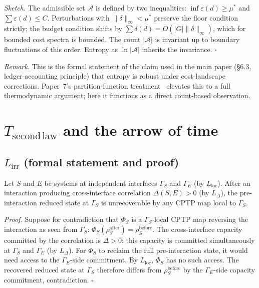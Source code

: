 \documentclass[11pt]{article}
\theoremstyle{remark}
\begin{document}
\textit{Sketch.}  The admissible set $\mathcal{A}$ is defined by two
inequalities: $\inf \varepsilon(d) \ge \mu^*$ and $\sum \varepsilon(d) \le C$.
Perturbations with $\|\delta\|_\infty < \mu^*$ preserve the floor
condition strictly; the budget condition shifts by $\sum \delta(d) = O(|G|\|\delta\|_\infty)$,
which for bounded cost spectra is bounded.  The count $|\mathcal{A}|$
is invariant up to boundary fluctuations of this order.  Entropy as
$\ln |\mathcal{A}|$ inherits the invariance.  \hfill$\square$

\noindent\textit{Remark.}  This is the formal statement of the claim
used in the main paper (\S 6.3, ledger-accounting principle) that entropy
is robust under cost-landscape corrections.  Paper~7's partition-function
treatment~\cite{Paper7} elevates this to a full thermodynamic argument;
here it functions as a direct count-based observation.


\section{$T_{\mathrm{second\,law}}$ and the arrow of time}
\label{sec:irr}

\subsection{$L_{\mathrm{irr}}$ (formal statement and proof)}

\begin{tcolorbox}[apfbox, title={Lemma 5.1 ($L_{\mathrm{irr}}$)}]
Let $S$ and $E$ be systems at independent interfaces $\Gamma_S$ and
$\Gamma_E$ (by $L_{\mathrm{loc}}$).  After an interaction producing
cross-interface correlation $\Delta(S,E) > 0$ (by $L_\Delta$), the
pre-interaction reduced state at $\Gamma_S$ is unrecoverable by any
CPTP map local to $\Gamma_S$.
\end{tcolorbox}

\textit{Proof.}  Suppose for contradiction that $\Phi_S$ is a
$\Gamma_S$-local CPTP map reversing the interaction as seen from
$\Gamma_S$: $\Phi_S(\rho_S^{\mathrm{after}}) = \rho_S^{\mathrm{before}}$.
The cross-interface capacity committed by the correlation is $\Delta > 0$;
this capacity is committed simultaneously at $\Gamma_S$ and $\Gamma_E$
(by $L_\Delta$).  For $\Phi_S$ to reclaim the full pre-interaction state,
it would need access to the $\Gamma_E$-side commitment.  By
$L_{\mathrm{loc}}$, $\Phi_S$ has no such access.  The recovered reduced
state at $\Gamma_S$ therefore differs from $\rho_S^{\mathrm{before}}$ by
the $\Gamma_E$-side capacity commitment, contradiction.  \hfill$\square$
\end{document}
